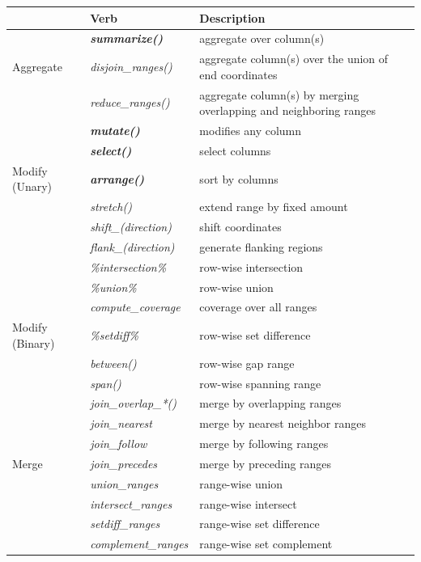 \documentclass[]{article}
\begin{document}
\begin{table}[!htbp]
\centering
\begin{tabular}{|l|l|p{6cm}|}
  \hline
  & Verb &  Description \\ 
  \hline
   & \textbf{\emph{summarize()}} & aggregate over column(s) \\ 
   Aggregate & \emph{disjoin\_ranges()} & aggregate column(s) over the union of end coordinates \\
   &  \emph{reduce\_ranges()} & aggregate column(s) by merging overlapping and neighboring ranges \\
   \hline
   &  \textbf{\emph{mutate()}} & modifies any column \\
   & \textbf{\emph{select()}} & select columns \\
  Modify (Unary) & \textbf{\emph{arrange()}} & sort by columns \\
   & \emph{stretch()} & extend range by fixed amount \\
   &  \emph{shift\_(direction)} & shift coordinates \\
   & \emph{flank\_(direction)} & generate flanking regions \\
   & \emph{\%intersection\% } & row-wise intersection \\
   & \emph{\%union\%} & row-wise union \\
   & \emph{compute\_coverage} & coverage over all ranges \\
  Modify (Binary) &  \emph{\%setdiff\%} & row-wise set difference \\
   & \emph{between()} & row-wise gap range \\
   & \emph{span()} & row-wise spanning range \\
   \hline
    & \emph{join\_overlap\_*()} & merge by overlapping ranges \\
    & \emph{join\_nearest} & merge by nearest neighbor ranges \\
    & \emph{join\_follow} & merge by following ranges \\
    Merge & \emph{join\_precedes} & merge by preceding ranges \\
    & \emph{union\_ranges} & range-wise union \\
    & \emph{intersect\_ranges} & range-wise intersect \\
    & \emph{setdiff\_ranges} & range-wise set difference \\
    & \emph{complement\_ranges} & range-wise set complement \\

\end{tabular}
\end{table}
\end{document}
